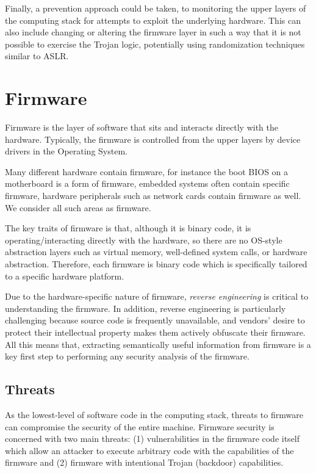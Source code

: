 \documentclass[11pt,letterpaper]{article}
\begin{document}
Finally, a prevention approach could be taken, to monitoring the upper
layers of the computing stack for attempts to exploit the underlying
hardware. This can also include changing or altering the firmware
layer in such a way that it is not possible to exercise the Trojan
logic, potentially using randomization techniques similar to ASLR. 

\section{Firmware}

Firmware is the layer of software that sits and interacts directly
with the hardware. Typically, the firmware is controlled from the
upper layers by device drivers in the Operating System.

Many different hardware contain firmware, for instance the boot BIOS
on a motherboard is a form of firmware, embedded systems often contain
specific firmware, hardware peripherals such as network cards contain
firmware as well. We consider all such areas as firmware.

The key traits of firmware is that, although it is binary code, it is
operating/interacting directly with the hardware, so there are no
OS-style abstraction layers such as virtual memory, well-defined
system calls, or hardware abstraction. Therefore, each firmware is
binary code which is specifically tailored to a specific hardware
platform.

Due to the hardware-specific nature of firmware, \emph{reverse
  engineering} is critical to understanding the firmware. In addition,
reverse engineering is particularly challenging because source code is
frequently unavailable, and vendors' desire to protect their
intellectual property makes them actively obfuscate their
firmware. All this means that, extracting semantically useful
information from firmware is a key first step to performing any
security analysis of the firmware.

\subsection{Threats}

As the lowest-level of software code in the computing stack, threats
to firmware can compromise the security of the entire machine.
Firmware security is concerned with two main threats: (1)
vulnerabilities in the firmware code itself which allow an attacker to
execute arbitrary code with the capabilities of the firmware and (2)
firmware with intentional Trojan (backdoor) capabilities.
\end{document}
